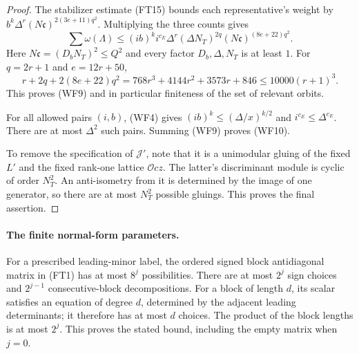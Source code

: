 \begin{proof}
The stabilizer estimate (FT15) bounds each representative's
weight by
$b^k\Delta^r(N\mathfrak c)^{2(3e+11)q^2}$.
Multiplying the three counts gives
\[
 \sum\omega(\Lambda)
 \leq (ib)^k i^{c_E}\Delta^r
       (\Delta N_T)^{2q}
       (N\mathfrak c)^{(8e+22)q^2}.
 \tag{WF11}
\]
Here $N\mathfrak c=(D_bN_T)^2\leq Q^2$ and every
factor $D_b,\Delta,N_T$ is at least $1$.  For
$q=2r+1$ and $e=12r+50$,
\[
 r+2q+2(8e+22)q^2
       =768r^3+4144r^2+3573r+846
       \leq10000(r+1)^3.
\]
This proves (WF9) and in particular finiteness of the
set of relevant orbits.

For all allowed pairs $(i,b)$, (WF4) gives
$(ib)^k\leq(\Delta/x)^{k/2}$ and $i^{c_E}\leq\Delta^{c_E}$.
There are at most $\Delta^2$ such pairs.  Summing (WF9)
proves (WF10).

To remove the specification of $\mathcal J'$, note that
it is a unimodular gluing of the fixed $L'$ and the
fixed rank-one lattice $\mathcal O cz$.  The latter's
discriminant module is cyclic of order $N_T^2$.
An anti-isometry from it is determined by the image of
one generator, so there are at most $N_T^2$ possible
gluings.  This proves the final assertion.
\end{proof}

\paragraph{The finite normal-form parameters.}
For a prescribed leading-minor label, the ordered signed
block antidiagonal matrix in (FT1) has at most $8^j$
possibilities.  There are at most $2^j$ sign choices
and $2^{j-1}$ consecutive-block decompositions.  For a
block of length $d$, its scalar satisfies an equation
of degree $d$, determined by the adjacent leading
determinants; it therefore has at most $d$ choices.
The product of the block lengths is at most $2^j$.
This proves the stated bound, including the empty
matrix when $j=0$.

